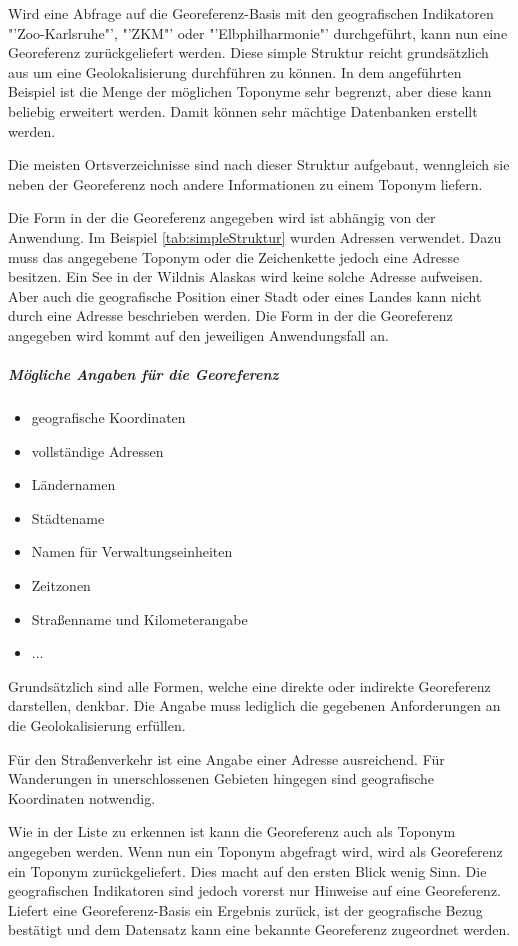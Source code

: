 		Wird eine Abfrage auf die Georeferenz-Basis mit den geografischen Indikatoren "'Zoo-Karlsruhe"', "'ZKM"' oder "'Elbphilharmonie"' durchgeführt, kann nun eine Georeferenz zurückgeliefert werden.
		Diese simple Struktur reicht grundsätzlich aus um eine Geolokalisierung durchführen zu können.
		In dem angeführten Beispiel ist die Menge der möglichen Toponyme sehr begrenzt, aber diese kann beliebig erweitert werden.
		Damit können sehr mächtige Datenbanken erstellt werden.

		Die meisten Ortsverzeichnisse sind nach dieser Struktur aufgebaut, wenngleich sie neben der Georeferenz noch andere Informationen zu einem Toponym liefern.

		Die Form in der die Georeferenz angegeben wird ist abhängig von der Anwendung. 
		Im Beispiel \ref{tab:simpleStruktur} wurden Adressen verwendet. 
		Dazu muss das angegebene Toponym oder die Zeichenkette jedoch eine Adresse besitzen. 
		Ein See in der Wildnis Alaskas wird keine solche Adresse aufweisen.
		Aber auch die geografische Position einer Stadt oder eines Landes kann nicht durch eine Adresse beschrieben werden. 
		Die Form in der die Georeferenz angegeben wird kommt auf den jeweiligen Anwendungsfall an.
		
		\subparagraph{Mögliche Angaben für die Georeferenz}

		\begin{itemize}
		  	 \item geografische Koordinaten
		  	 \item vollständige Adressen
		  	 \item Ländernamen
		  	 \item Städtename
		  	 \item Namen für Verwaltungseinheiten 
		  	 \item Zeitzonen
		  	 \item Straßenname und Kilometerangabe
		  	 \item ...
		  \end{itemize}  

	 	Grundsätzlich sind alle Formen, welche eine direkte oder indirekte Georeferenz darstellen, denkbar.
	 	Die Angabe muss lediglich die gegebenen Anforderungen an die Geolokalisierung erfüllen.

	  	Für den Straßenverkehr ist eine Angabe einer Adresse ausreichend.
		Für Wanderungen in unerschlossenen Gebieten hingegen sind geografische Koordinaten notwendig. 

		Wie in der Liste zu erkennen ist kann die Georeferenz auch als Toponym angegeben werden.
		Wenn nun ein Toponym abgefragt wird, wird als Georeferenz ein Toponym zurückgeliefert.
		Dies macht auf den ersten Blick wenig Sinn.
		Die geografischen Indikatoren sind jedoch vorerst nur Hinweise auf eine Georeferenz.
		Liefert eine Georeferenz-Basis ein Ergebnis zurück, ist der geografische Bezug bestätigt und dem Datensatz kann eine bekannte Georeferenz zugeordnet werden.				
	
